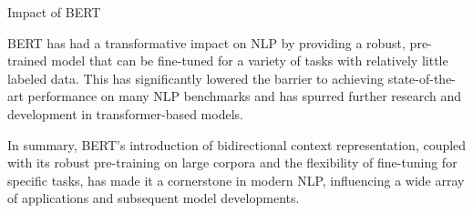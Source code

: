  Impact of BERT

BERT has had a transformative impact on NLP by providing a robust, pre-trained model that can be fine-tuned for a variety of tasks with relatively little labeled data. This has significantly lowered the barrier to achieving state-of-the-art performance on many NLP benchmarks and has spurred further research and development in transformer-based models.

In summary, BERT's introduction of bidirectional context representation, coupled with its robust pre-training on large corpora and the flexibility of fine-tuning for specific tasks, has made it a cornerstone in modern NLP, influencing a wide array of applications and subsequent model developments.
